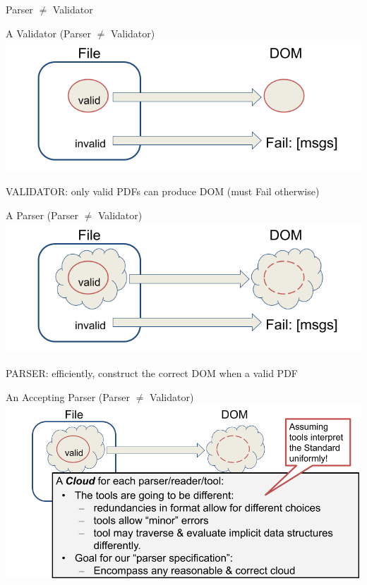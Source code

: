 \documentclass[t,10pt,xcolor={dvipsnames}]{beamer}
\begin{document}
\begin{frame}[label={sec:org663ad2b}]{Parser \(\neq\) Validator}
\end{frame}
\begin{frame}[label={sec:org20fa4d1}]{A Validator (Parser \(\neq\) Validator)}
\vspace{10pt}
\includegraphics[width=0.80\linewidth]{images/pNEQv-1.png}
\vfill

VALIDATOR: only valid PDFs can produce DOM (must Fail otherwise)
\end{frame}

\begin{frame}[label={sec:orgf65a879}]{A Parser (Parser \(\neq\) Validator)}
\vspace{10pt}
\includegraphics[width=0.80\linewidth]{images/pNEQv-2.png}
\vfill

PARSER: efficiently, construct the correct DOM when a valid PDF
\end{frame}

\begin{frame}[label={sec:orge235717}]{An Accepting Parser (Parser \(\neq\) Validator)}
\vspace{10pt}
\includegraphics[width=0.95\linewidth]{images/pNEQv-3.png}
\end{frame}
\end{document}
